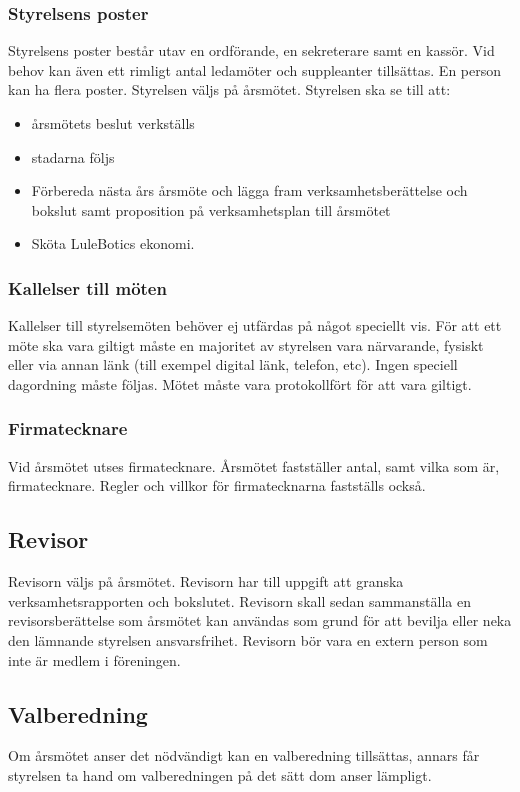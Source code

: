 \documentclass{article}
\begin{document}
\subsubsection{Styrelsens poster}

Styrelsens poster består utav en ordförande, en sekreterare samt en kassör.
Vid behov kan även ett rimligt antal ledamöter och suppleanter tillsättas.
En person kan ha flera poster.
Styrelsen väljs på årsmötet.
Styrelsen ska se till att:
\begin{itemize}[noitemsep]
    \item årsmötets beslut verkställs
    \item stadarna följs
    \item Förbereda nästa års årsmöte och lägga fram verksamhetsberättelse och bokslut samt proposition på verksamhetsplan till årsmötet
    \item Sköta LuleBotics ekonomi.
\end{itemize}


\subsubsection{Kallelser till möten}
Kallelser till styrelsemöten behöver ej utfärdas på något speciellt vis. För att ett möte ska vara giltigt måste en majoritet av styrelsen vara närvarande, fysiskt eller via annan länk (till exempel digital länk, telefon, etc). Ingen speciell dagordning måste följas. Mötet måste vara protokollfört för att vara giltigt.

\subsubsection{Firmatecknare}
Vid årsmötet utses firmatecknare. Årsmötet fastställer antal, samt vilka som är, firmatecknare. Regler och villkor för firmatecknarna fastställs också. 

\subsection{Revisor}
Revisorn väljs på årsmötet. Revisorn har till uppgift att granska verksamhetsrapporten och bokslutet. Revisorn skall sedan sammanställa en revisorsberättelse som årsmötet kan användas som grund för att bevilja eller neka den lämnande styrelsen ansvarsfrihet. Revisorn bör vara en extern person som inte är medlem i föreningen.

\subsection{Valberedning}
Om årsmötet anser det nödvändigt kan en valberedning tillsättas, annars får styrelsen ta hand om valberedningen på det sätt dom anser lämpligt. 
\end{document}
